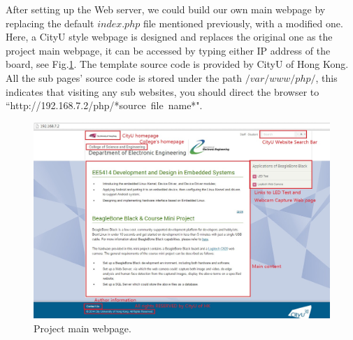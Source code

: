 \documentclass[12pt,journal,draftclsnofoot,onecolumn]{IEEEtran}
\begin{document}
After setting up the Web server, we could build our own main webpage by replacing the default $index.php$ file mentioned previously, with a modified one. Here, a CityU style webpage is designed and replaces the original one as the project main webpage, it can be accessed by typing either IP address of the board, see Fig.\ref{mainpage}. The template source code is provided by CityU of Hong Kong. All the sub pages' source code is stored under the path $/var/www/php/$, this indicates that visiting any sub websites, you should direct the browser to ``http://192.168.7.2/php/*source\ file\ name*".
\begin{figure}[htb]
	\centering
	\includegraphics[width=6in]{./figs/mainpage.jpg}
	\caption{Project main webpage.}
	\label{mainpage}
\end{figure}
	
\end{document}
